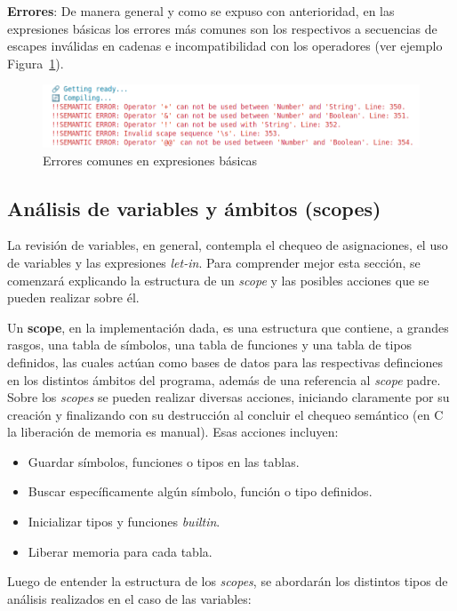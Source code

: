 \documentclass{llncs}
\begin{document}
\textbf{Errores}: De manera general y como se expuso con anterioridad, en las expresiones básicas los errores más comunes son 
los respectivos a secuencias de escapes inválidas en cadenas e incompatibilidad con los operadores (ver ejemplo Figura~\ref{fig:errores_1}).
\begin{figure}[h]
\centering
\includegraphics[width=1\textwidth]{images/basic_errors.png}
\caption{Errores comunes en expresiones básicas}
\label{fig:errores_1}
\end{figure}

\subsection{Análisis de variables y ámbitos (scopes)}

La revisión de variables, en general, contempla el chequeo de asignaciones, el uso de variables y
las expresiones \textit{let-in}. Para comprender mejor esta sección, se comenzará explicando la estructura 
de un \textit{scope} y las posibles acciones que se pueden realizar sobre él.

Un \textbf{scope}, en la implementación dada, es una estructura que contiene, a grandes rasgos, una tabla de
símbolos, una tabla de funciones y una tabla de tipos definidos, las cuales actúan como bases de datos para las
respectivas definciones en los distintos ámbitos del programa, además de una referencia al \textit{scope} padre.
Sobre los \textit{scopes} se pueden realizar diversas  acciones, iniciando claramente por su creación y
finalizando con su destrucción al concluir el chequeo semántico (en C la liberación de memoria es manual). Esas
acciones incluyen:
\begin{itemize}
    \item Guardar símbolos, funciones o tipos en las tablas.
    \item Buscar específicamente algún símbolo, función o tipo definidos.
    \item Inicializar tipos y funciones \textit{builtin}.
    \item Liberar memoria para cada tabla.
\end{itemize}

Luego de entender la estructura de los \textit{scopes}, se abordarán los distintos tipos de análisis realizados en el caso 
de las variables: 
\end{document}
